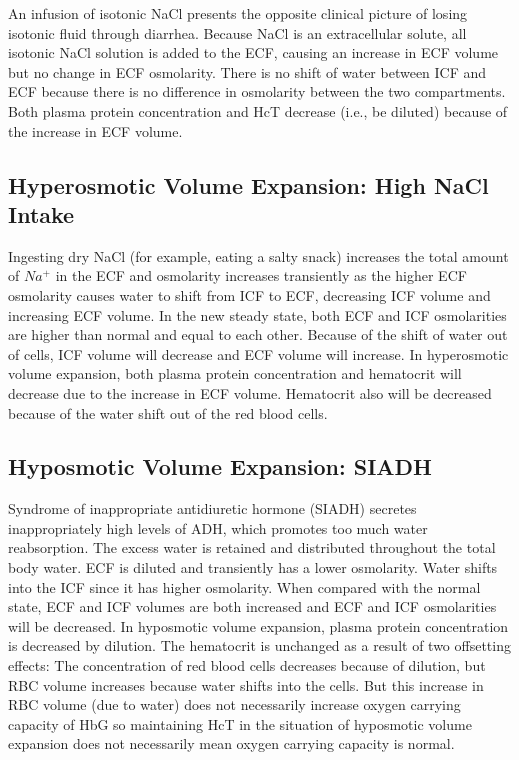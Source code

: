 An infusion of isotonic NaCl presents the opposite clinical picture of losing isotonic fluid through diarrhea. Because NaCl is an extracellular solute, all isotonic NaCl solution is added to the ECF, causing an increase in ECF volume but no change in ECF osmolarity. There is no shift of water between ICF and ECF because there is no difference in osmolarity between the two compartments. Both plasma protein concentration and HcT decrease (i.e., be diluted) because of the increase in ECF volume. 

\subsection{Hyperosmotic Volume Expansion: High NaCl Intake} 

Ingesting dry NaCl (for example, eating a salty snack) increases the total amount of $Na^+$ in the ECF and osmolarity increases transiently as the higher ECF osmolarity causes water to shift from ICF to ECF, decreasing ICF volume and increasing ECF volume. In the new steady state, both ECF and ICF osmolarities are higher than normal and equal to each other. Because of the shift of water out of cells, ICF volume will decrease and ECF volume will increase. In hyperosmotic volume expansion, both plasma protein concentration and hematocrit will decrease due to the increase in ECF volume. Hematocrit also will be decreased because of the water shift out of the red blood cells. 

\subsection{Hyposmotic Volume Expansion: SIADH} 

Syndrome of inappropriate antidiuretic hormone (SIADH) secretes inappropriately high levels of ADH, which promotes too much water reabsorption. The excess water is retained and distributed throughout the total body water. ECF is diluted and transiently has a lower osmolarity. Water shifts into the ICF since it has higher osmolarity. When compared with the normal state, ECF and ICF volumes are both increased and ECF and ICF osmolarities will be decreased. In hyposmotic volume expansion, plasma protein concentration is decreased by dilution. The hematocrit is unchanged as a result of two offsetting effects: The concentration of red blood cells decreases because of dilution, but RBC volume increases because water shifts into the cells. But this increase in RBC volume (due to water) does not necessarily increase oxygen carrying capacity of HbG so maintaining HcT in the situation of hyposmotic volume expansion does not necessarily mean oxygen carrying capacity is normal.



